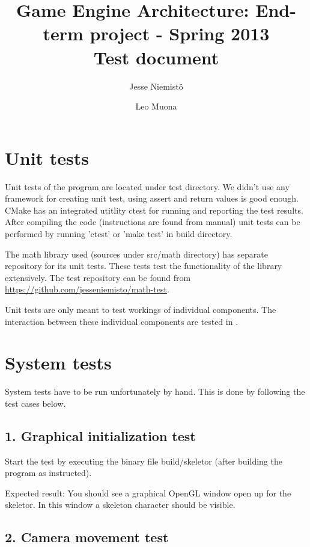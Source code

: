 \documentclass[11pt,twoside,a4paper]{article}
\begin{document}
\author{Jesse Niemistö \and Leo Muona}
\title{Game Engine Architecture: End-term project - Spring 2013 \\
       Test document}

\maketitle

\section{Unit tests}
\label{sec:unit_tests}

Unit tests of the program are located under test directory. We didn't use any framework for creating unit test, using assert and return values is good enough. CMake has an integrated utitlity ctest for running and reporting the test results. After compiling the code (instructions are found from manual) unit tests can be performed by running 'ctest' or 'make test' in build directory.

The math library used (sources under src/math directory) has separate repository for its unit tests. These tests test the functionality of the library extensively. The test repository can be found from \url{https://github.com/jesseniemisto/math-test}.

Unit tests are only meant to test workings of individual components. The interaction between these individual components are tested in .

\section{System tests}
\label{sec:system_tests}

System tests have to be run unfortunately by hand. This is done by following the test cases below.

\subsection{1. Graphical initialization test}

Start the test by executing the binary file build/skeletor (after building the program as instructed).

Expected result: You should see a graphical OpenGL window open up for the skeletor. In this window a skeleton character should be visible.

\subsection{2. Camera movement test}
\end{document}
